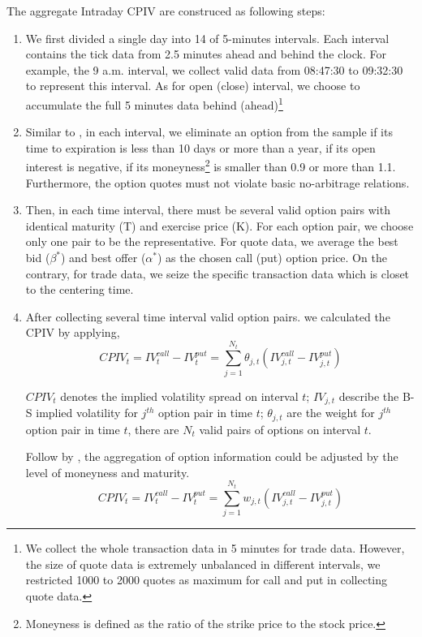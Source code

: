 The aggregate Intraday CPIV are construced as following steps: 
\begin{enumerate}
\item  We first divided a single day into 14 of 5-minutes intervals. Each interval contains the tick data from 2.5 minutes ahead and behind the clock. For example, the 9 a.m. interval, we collect valid data from 08:47:30 to 09:32:30 to represent this interval. As for open (close) interval, we choose to accumulate the full 5 minutes data behind (ahead)\footnote{We collect the whole transaction data in 5 minutes for trade data. However, the size of quote data is extremely unbalanced in different intervals, we restricted 1000 to 2000 quotes as maximum for call and put in collecting quote data.}

\item Similar to \textcite{xing2010does}, in each interval, we eliminate an option from the sample if its time to expiration is less than 10 days or more than a year, if its open interest is negative, if its moneyness\footnote{Moneyness is defined as the ratio of the strike price to the stock price.} is smaller than 0.9 or more than 1.1. Furthermore, the option quotes must not violate basic no-arbitrage relations.

\item Then, in each time interval, there must be several valid option pairs with identical maturity (T) and exercise price (K). For each option pair, we choose only one pair to be the representative. For quote data, we average the best bid ($\beta ^{\ast }$) and best offer ($\alpha ^{\ast }$) as the chosen call (put) option price. On the contrary, for trade data, we seize the specific transaction data which is closet to the centering time.  

\item After collecting several time interval valid option pairs. we calculated the CPIV by applying, 
 \begin{equation} \label{eq: withoutadj}
CPIV_{t} = IV_{t}^{call} - IV_{t}^{put} = \sum_{j = 1}^{N_{t}}\theta _{j,t}(IV_{j,t}^{call} - IV_{j,t}^{put})
 \end{equation}
 
$CPIV_{t}$ denotes the implied volatility spread on interval $t$; $IV_{j,t}$ describe the B-S implied volatility for $j^{th}$ option pair in time $t$; $\theta_{j,t}$ are the weight for $j^{th}$ option pair in time $t$, there are $N_{t}$ valid pairs of options on interval $t$. 

Follow by \textcite{holowczak2013aggregating}, the aggregation of option information could be adjusted by the level of moneyness and maturity. 
 \begin{equation} \label{eq: withadj}
CPIV_{t} = IV_{t}^{call} - IV_{t}^{put} = \sum_{j = 1}^{N_{t}}w_{j,t}(IV_{j,t}^{call} - IV_{j,t}^{put})
 \end{equation}


\end{enumerate}

